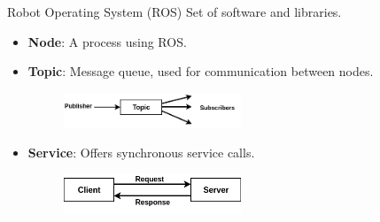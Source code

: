 \begin{frame}{Robot Operating System (ROS)}
Set of software and libraries.
\begin{itemize}
    \item \textbf{Node}: A process using ROS. 
    \item \textbf{Topic}: Message queue, used for communication between nodes.
    \begin{figure}
        \includegraphics[width=0.5\textwidth]{gfx/topic.png}
    \end{figure}
    \item \textbf{Service}: Offers synchronous service calls.
    \begin{figure}
        \includegraphics[width=0.5\textwidth]{gfx/service.png}
    \end{figure}
\end{itemize}
\end{frame}